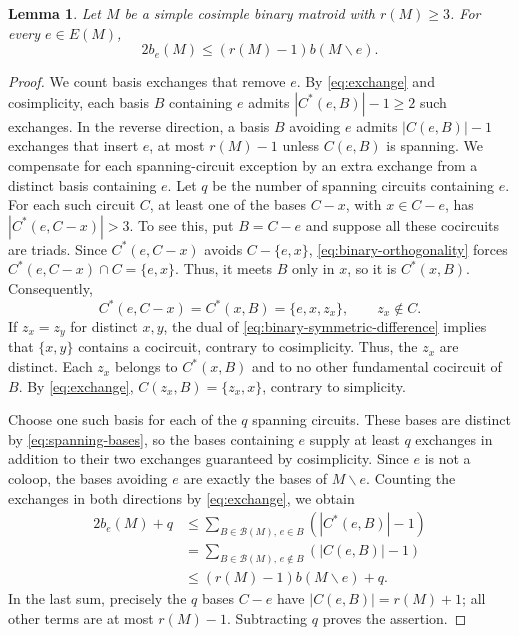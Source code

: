 \documentclass[11pt]{article}
\numberwithin{equation}{section}
\newtheorem{lemma}[lemma]{Lemma}
\newcommand{\BB}{\mathcal B}
\begin{document}
\begin{lemma}\label{lem:exchange-count}
Let \(M\) be a simple cosimple binary matroid with \(r(M)\ge3\).
For every \(e\in E(M)\),
\[
 2b_e(M)\le(r(M)-1)b(M\backslash e).
\]
\end{lemma}
\begin{proof}
We count basis exchanges that remove \(e\). By \eqref{eq:exchange}
and cosimplicity, each basis \(B\) containing \(e\) admits
\(|C^*(e,B)|-1\ge2\) such exchanges. In the reverse direction,
a basis \(B\) avoiding \(e\) admits \(|C(e,B)|-1\) exchanges that
insert \(e\), at most \(r(M)-1\) unless \(C(e,B)\) is spanning.
We compensate for each spanning-circuit exception by an extra exchange
from a distinct basis containing \(e\).
Let \(q\) be the number of spanning circuits containing \(e\).
For each such circuit \(C\), at least one of the bases
\(C-x\), with \(x\in C-e\), has \(|C^*(e,C-x)|>3\).
To see this, put \(B=C-e\) and suppose all these cocircuits
are triads. Since \(C^*(e,C-x)\) avoids \(C-\{e,x\}\),
\eqref{eq:binary-orthogonality} forces
\(C^*(e,C-x)\cap C=\{e,x\}\).
Thus, it meets \(B\) only in \(x\), so it is \(C^*(x,B)\).
Consequently,
\[
 C^*(e,C-x)=C^*(x,B)=\{e,x,z_x\},\qquad z_x\notin C.
\]
If \(z_x=z_y\) for distinct \(x,y\), the dual of
\eqref{eq:binary-symmetric-difference} implies that
\(\{x,y\}\) contains a cocircuit, contrary to cosimplicity.
Thus, the \(z_x\) are distinct. Each \(z_x\) belongs to
\(C^*(x,B)\) and to no other fundamental cocircuit of \(B\).
By \eqref{eq:exchange}, \(C(z_x,B)=\{z_x,x\}\), contrary
to simplicity.

Choose one such basis for each of the \(q\) spanning circuits.
These bases are distinct by \eqref{eq:spanning-bases}, so the
bases containing \(e\) supply at least \(q\) exchanges in addition
to their two exchanges guaranteed by cosimplicity.
Since \(e\) is not a coloop, the bases avoiding \(e\) are exactly
the bases of \(M\backslash e\).
Counting the exchanges in both directions by \eqref{eq:exchange}, we obtain
\begin{align*}
 2b_e(M)+q
 &\le\sum_{B\in\BB(M),\,e\in B} (|C^*(e,B)|-1)\\
 &=\sum_{B\in\BB(M),\,e\notin B} (|C(e,B)|-1)\\
 &\le(r(M)-1)b(M\backslash e)+q.
\end{align*}
In the last sum, precisely the \(q\) bases \(C-e\) have
\(|C(e,B)|=r(M)+1\); all other terms are at most \(r(M)-1\).
Subtracting \(q\) proves the assertion.
\end{proof}
\end{document}
